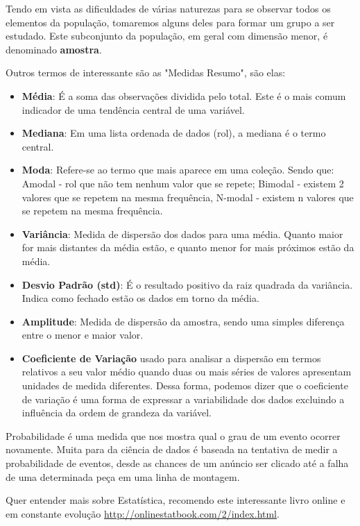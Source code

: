 Tendo em vista as dificuldades de várias naturezas para se observar todos os elementos da população, tomaremos alguns deles para formar um grupo a ser estudado. Este subconjunto da população, em geral com dimensão menor, é denominado \textbf{amostra}.

Outros termos de interessante são as "Medidas Resumo", são elas:
\begin{itemize}
	\item \textbf{Média}: É a soma das observações dividida pelo total. Este é o mais comum indicador de uma tendência central de uma variável.
	\item \textbf{Mediana}: Em uma lista ordenada de dados (rol), a mediana é o termo central.
	\item \textbf{Moda}: Refere-se ao termo que mais aparece em uma coleção. Sendo que: Amodal - rol que não tem nenhum valor que se repete; Bimodal - existem 2 valores que se repetem na mesma frequência, N-modal - existem n valores que se repetem na mesma frequência.
	\item \textbf{Variância}: Medida de dispersão dos dados para uma média. Quanto maior for mais distantes da média estão, e quanto menor for mais próximos estão da média.
	\item \textbf{Desvio Padrão (std)}: É o resultado positivo da raiz quadrada da variância. Indica como fechado estão os dados em torno da média.
	\item \textbf{Amplitude}: Medida de dispersão da amostra, sendo uma simples diferença entre o menor e maior valor.
	\item \textbf{Coeficiente de Variação} usado para analisar a dispersão em termos relativos a seu valor médio quando duas ou mais séries de valores apresentam unidades de medida diferentes. Dessa forma, podemos dizer que o coeficiente de variação é uma forma de expressar a variabilidade dos dados excluindo a influência da ordem de grandeza da variável.
\end{itemize}

Probabilidade é uma medida que nos mostra qual o grau de um evento ocorrer novamente. Muita para da ciência de dados é baseada na tentativa de medir a probabilidade de eventos, desde as chances de um anúncio ser clicado até a falha de uma determinada peça em uma linha de montagem.

\begin{note} Quer entender mais sobre Estatística, recomendo este interessante livro online e em constante evolução \url{http://onlinestatbook.com/2/index.html}.
\end{note}
	
